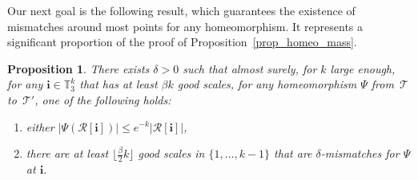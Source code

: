 \documentclass[JEP,XML,SOM,Unicode,NoFloatCountersInSection,published]{cedram}
\newcommand{\Tt}{\mathcal{T}}
\newcommand{\Rr}{\mathcal{R}}
\newcommand{\ii}{\mathbf{i}}
\theoremstyle{plain}
\newtheorem{proposition}[theorem]{Proposition}
\theoremstyle{definition}
\begin{document}
Our next goal is the following result, which guarantees the existence of mismatches around most points for any homeomorphism.
It represents a significant proportion of the proof of Proposition~\ref{prop_homeo_mass}.
\begin{proposition}\label{prop_existence_mismatches}
There exists $\delta>0$ such that almost surely, for $k$ large enough, for any $\ii \in \mathbb{T}_3^k$ that has at least $\beta k$ good scales, for any homeomorphism $\Psi$ from~$\Tt$ to~$\Tt'$, one of the following holds:
\begin{enumerate}
\item \label{it:prop:image region is small} either $\left| \Psi \left( \Rr[\ii] \right) \right| \leq e^{-k} \left| \Rr[\ii] \right|$,
\item\label{it:prop:many mismatches} there are at least $\lfloor\frac{\beta}{2} k \rfloor$ good scales in $\{1,\dots,k-1\}$ that are $\delta$-mismatches for $\Psi$ at $\ii$.
\end{enumerate}
\end{proposition}
\end{document}
